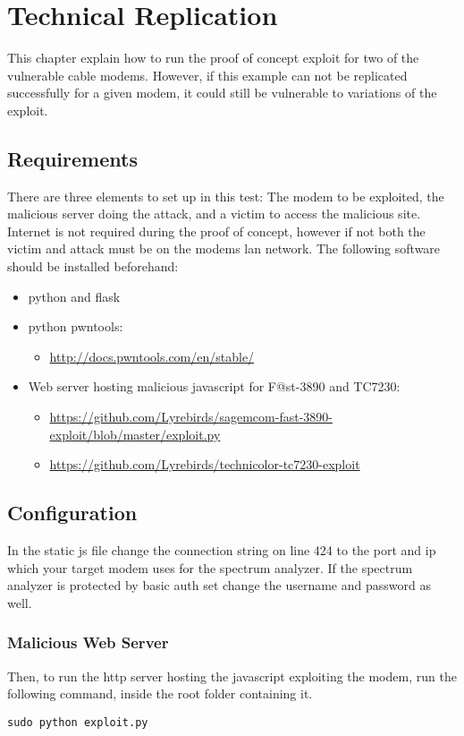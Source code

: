 \chapter{Technical Replication}
\label{app:technical_replication}
This chapter explain how to run the proof of concept exploit for two of the vulnerable cable modems.
However, if this example can not be replicated successfully for a given modem, it could still be vulnerable to variations of the exploit.

\section{Requirements}
There are three elements to set up in this test: The modem to be exploited, the malicious server doing the attack, and a victim to access the malicious site.
Internet is not required during the proof of concept, however if not both the victim and attack must be on the modems lan network. The following software should be installed beforehand:

\begin{itemize}
    \item python and flask
    \item python pwntools:
    \begin{itemize}
        \item \url{http://docs.pwntools.com/en/stable/}
    \end{itemize}
    \item Web server hosting malicious javascript for F@st-3890 and TC7230: 
    \begin{itemize}
        \item \url{https://github.com/Lyrebirds/sagemcom-fast-3890-exploit/blob/master/exploit.py}
        \item \url{https://github.com/Lyrebirds/technicolor-tc7230-exploit}
    \end{itemize}
\end{itemize}

\section{Configuration}
In the static js file change the connection string on line 424 to the port and ip which your target modem uses for the spectrum analyzer. 
If the spectrum analyzer is protected by basic auth set change the username and password as well.

\subsection{Malicious Web Server}
Then, to run the http server hosting the javascript exploiting the modem, run the following command, inside the root folder containing it.
\begin{lstlisting}[numbers=none]
    sudo python exploit.py
\end{lstlisting}

